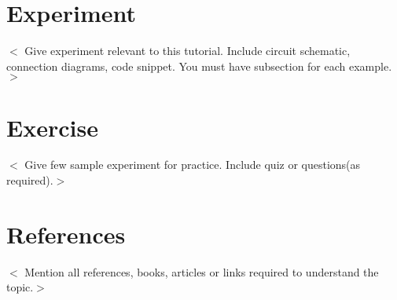 \documentclass[11pt,a4paper]{article}
\begin{document}
	\section{Experiment}
	$<$ Give experiment relevant to this tutorial. Include circuit schematic, connection diagrams, code snippet. You must have subsection for each example.$>$
	\newpage
	\section{Exercise}
	$<$ Give few sample experiment for practice. Include quiz or questions(as required).$>$
	\newpage
	\section{References}
	$<$ Mention all references, books, articles or links required to understand the topic.$>$
	
\end{document}
